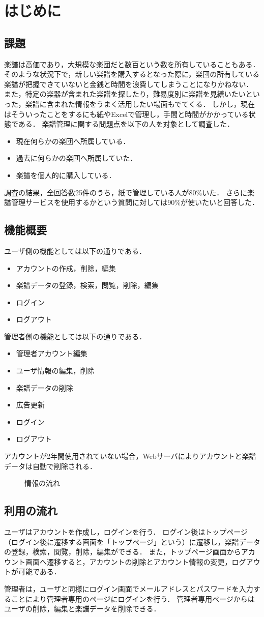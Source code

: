 \chapter{{はじめに}}
\section{課題}
楽譜は高価であり，大規模な楽団だと数百という数を所有していることもある．
そのような状況下で，新しい楽譜を購入するとなった際に，楽団の所有している楽譜が把握できていないと金銭と時間を浪費してしまうことになりかねない．
また，特定の楽器が含まれた楽譜を探したり，難易度別に楽譜を見繕いたいといった，楽譜に含まれた情報をうまく活用したい場面もでてくる．
しかし，現在はそういったことをするにも紙やExcelで管理し，手間と時間がかかっている状態である．
楽譜管理に関する問題点を以下の人を対象として調査した．
\begin{itemize}
	\item 現在何らかの楽団へ所属している．
	\item 過去に何らかの楽団へ所属していた．
	\item 楽譜を個人的に購入している．
\end{itemize}
調査の結果，全回答数25件のうち，紙で管理している人が80\%いた．
さらに楽譜管理サービスを使用するかという質問に対しては90\%が使いたいと回答した．
\section{機能概要}
ユーザ側の機能としては以下の通りである．
\begin{itemize}
	\item アカウントの作成，削除，編集
	\item 楽譜データの登録，検索，閲覧，削除，編集
	\item ログイン
	\item ログアウト
\end{itemize}
管理者側の機能としては以下の通りである．
\begin{itemize}
	\item 管理者アカウント編集
	\item ユーザ情報の編集，削除
	\item 楽譜データの削除
	\item 広告更新
	\item ログイン
	\item ログアウト
\end{itemize}
アカウントが2年間使用されていない場合，Webサーバによりアカウントと楽譜データは自動で削除される．
\begin{figure}[h]
	\centering
	
	\caption{情報の流れ}
\end{figure}
\section{利用の流れ}
ユーザはアカウントを作成し，ログインを行う．
ログイン後はトップページ（ログイン後に遷移する画面を「トップページ」という）に遷移し，楽譜データの登録，検索，閲覧，削除，編集ができる．
また，トップページ画面からアカウント画面へ遷移すると，アカウントの削除とアカウント情報の変更，ログアウトが可能である．\par
管理者は，ユーザと同様にログイン画面でメールアドレスとパスワードを入力することにより管理者専用のページにログインを行う．
管理者専用ページからはユーザの削除，編集と楽譜データを削除できる．